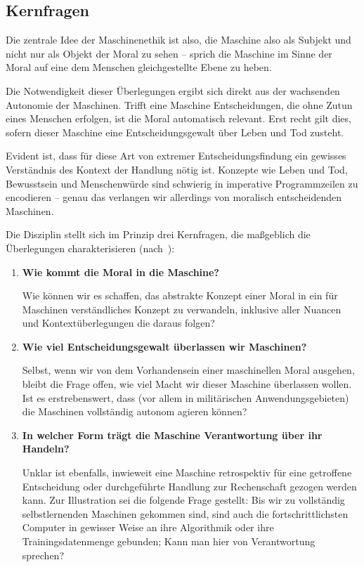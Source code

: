 \documentclass[twocolumn, german]{tum-article}
\begin{document}
\subsection{Kernfragen}
Die zentrale Idee der Maschinenethik ist also, die Maschine also als Subjekt und nicht nur als Objekt der Moral zu sehen -- sprich die Maschine im Sinne der Moral auf eine dem Menschen gleichgestellte Ebene zu heben.

Die Notwendigkeit dieser Überlegungen ergibt sich direkt aus der wachsenden Autonomie der Maschinen.
Trifft eine Maschine Entscheidungen, die ohne Zutun eines Menschen erfolgen, ist die Moral automatisch relevant.
Erst recht gilt dies, sofern dieser Maschine eine Entscheidungsgewalt über Leben und Tod zusteht.

Evident ist, dass für diese Art von extremer Entscheidungsfindung ein gewisses Verständnis des Kontext der Handlung nötig ist.
Konzepte wie Leben und Tod, Bewusstsein und Menschenwürde sind schwierig in imperative Programmzeilen zu encodieren -- genau das verlangen wir allerdings von moralisch entscheidenden Maschinen.

Die Disziplin stellt sich im Prinzip drei Kernfragen, die maßgeblich die Überlegungen charakterisieren (nach~\cite[S. 13ff.]{bendel-mascheth}):
\begin{enumerate}
	\item \textbf{Wie kommt die Moral in die Maschine?}

	Wie können wir es schaffen, das abstrakte Konzept einer \glqq Moral\grqq{} in ein für Maschinen verständliches Konzept zu verwandeln, inklusive aller Nuancen und Kontextüberlegungen die daraus folgen?
	
	\item \textbf{Wie viel Entscheidungsgewalt überlassen wir Maschinen?}

	Selbst, wenn wir von dem Vorhandensein einer maschinellen Moral ausgehen, bleibt die Frage offen, wie viel Macht wir dieser Maschine überlassen wollen.
	Ist es erstrebenswert, dass (vor allem in militärischen Anwendungsgebieten) die Maschinen vollständig autonom agieren können?
	
	\item \textbf{In welcher Form trägt die Maschine Verantwortung über ihr Handeln?}

	Unklar ist ebenfalls, inwieweit eine Maschine retrospektiv für eine getroffene Entscheidung oder durchgeführte Handlung zur Rechenschaft gezogen werden kann.
	Zur Illustration sei die folgende Frage gestellt: Bis wir zu vollständig selbstlernenden Maschinen gekommen sind, sind auch die fortschrittlichsten Computer in gewisser Weise an ihre Algorithmik oder ihre Trainingsdatenmenge gebunden; Kann man hier von Verantwortung sprechen?
\end{enumerate}
\end{document}
